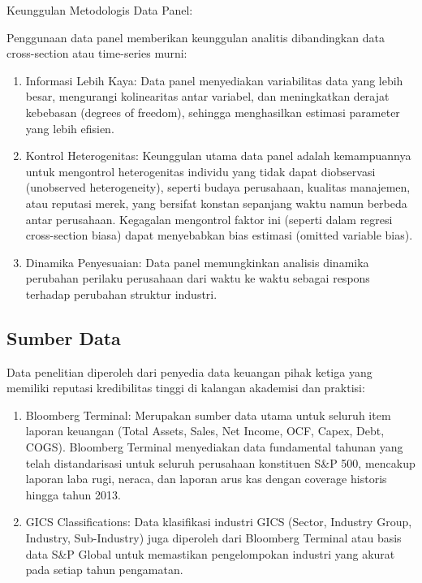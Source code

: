 \documentclass[12pt,a4paper]{report}
\providecommand{\tightlist}{%
  \setlength{\itemsep}{0pt}\setlength{\parskip}{0pt}%
}
\begin{document}
Keunggulan Metodologis Data Panel:

Penggunaan data panel memberikan keunggulan analitis dibandingkan data
cross-section atau time-series murni:

\begin{enumerate}
\def\labelenumi{\arabic{enumi}.}
\tightlist
\item
  Informasi Lebih Kaya: Data panel menyediakan variabilitas data yang
  lebih besar, mengurangi kolinearitas antar variabel, dan meningkatkan
  derajat kebebasan (degrees of freedom), sehingga menghasilkan estimasi
  parameter yang lebih efisien.
\item
  Kontrol Heterogenitas: Keunggulan utama data panel adalah kemampuannya
  untuk mengontrol heterogenitas individu yang tidak dapat diobservasi
  (unobserved heterogeneity), seperti budaya perusahaan, kualitas
  manajemen, atau reputasi merek, yang bersifat konstan sepanjang waktu
  namun berbeda antar perusahaan. Kegagalan mengontrol faktor ini
  (seperti dalam regresi cross-section biasa) dapat menyebabkan bias
  estimasi (omitted variable bias).
\item
  Dinamika Penyesuaian: Data panel memungkinkan analisis dinamika
  perubahan perilaku perusahaan dari waktu ke waktu sebagai respons
  terhadap perubahan struktur industri.
\end{enumerate}

\hypertarget{sumber-data}{%
\subsection{Sumber Data}\label{sumber-data}}

Data penelitian diperoleh dari penyedia data keuangan pihak ketiga yang
memiliki reputasi kredibilitas tinggi di kalangan akademisi dan
praktisi:

\begin{enumerate}
\def\labelenumi{\arabic{enumi}.}
\tightlist
\item
  Bloomberg Terminal: Merupakan sumber data utama untuk seluruh item
  laporan keuangan (Total Assets, Sales, Net Income, OCF, Capex, Debt,
  COGS). Bloomberg Terminal menyediakan data fundamental tahunan yang
  telah distandarisasi untuk seluruh perusahaan konstituen S\&P 500,
  mencakup laporan laba rugi, neraca, dan laporan arus kas dengan
  coverage historis hingga tahun 2013.
\item
  GICS Classifications: Data klasifikasi industri GICS (Sector, Industry
  Group, Industry, Sub-Industry) juga diperoleh dari Bloomberg Terminal
  atau basis data S\&P Global untuk memastikan pengelompokan industri
  yang akurat pada setiap tahun pengamatan.
\end{enumerate}
\end{document}
